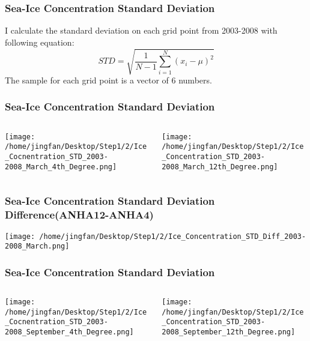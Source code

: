 \documentclass{beamer}
\begin{document}
\begin{frame}
\frametitle{Sea-Ice Concentration Standard Deviation}
I calculate the standard deviation on each grid point from 2003-2008 with following equation: $$ STD = \sqrt{\frac{1}{N-1}\sum^N_{i=1}(x_i-\mu)^2} $$
The sample for each grid point is a vector of 6 numbers.
\end{frame}

\begin{frame}
\frametitle{Sea-Ice Concentration Standard Deviation}

\begin{columns}
\begin{column}[t]{0.5\linewidth}
\centering
\texttt{[image: /home/jingfan/Desktop/Step1/2/Ice\_Cocnentration\_STD\_2003-2008\_March\_4th\_Degree.png]}
\end{column}
\begin{column}[t]{0.5\linewidth}
\centering
\texttt{[image: /home/jingfan/Desktop/Step1/2/Ice\_Concentration\_STD\_2003-2008\_March\_12th\_Degree.png]}
\end{column}
\end{columns}

\end{frame}

\begin{frame}
\frametitle{Sea-Ice Concentration Standard Deviation Difference(ANHA12-ANHA4)}

\texttt{[image: /home/jingfan/Desktop/Step1/2/Ice\_Concentration\_STD\_Diff\_2003-2008\_March.png]}

\end{frame}

\begin{frame}
\frametitle{Sea-Ice Concentration Standard Deviation}

\begin{columns}
\begin{column}[t]{0.5\linewidth}
\centering
\texttt{[image: /home/jingfan/Desktop/Step1/2/Ice\_Cocnentration\_STD\_2003-2008\_September\_4th\_Degree.png]}
\end{column}
\begin{column}[t]{0.5\linewidth}
\centering
\texttt{[image: /home/jingfan/Desktop/Step1/2/Ice\_Concentration\_STD\_2003-2008\_September\_12th\_Degree.png]}
\end{column}
\end{columns}

\end{frame}
\end{document}
